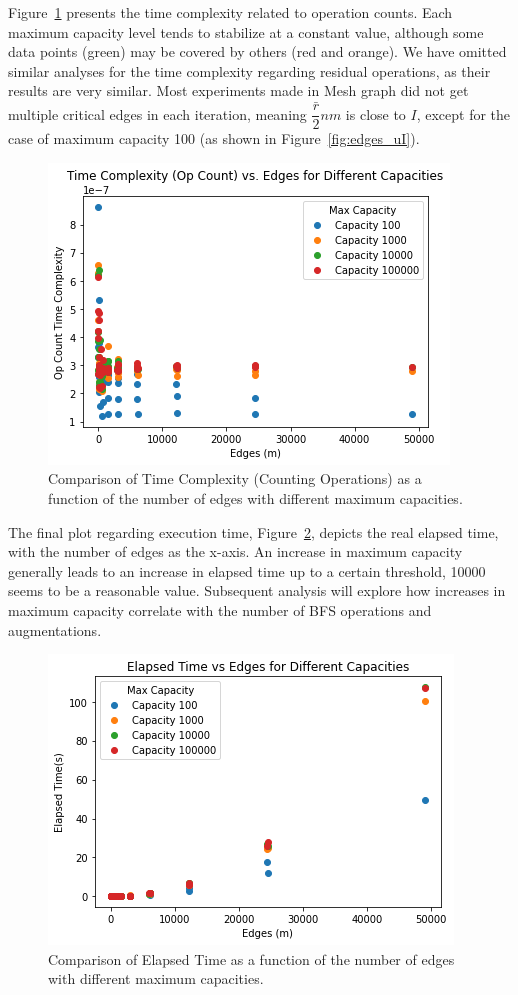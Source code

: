 \documentclass{article}
\begin{document}
Figure~\ref{fig:opcount_time} presents the time complexity related to operation counts. Each maximum capacity level tends to stabilize at a constant value, although some data points (green) may be covered by others (red and orange). We have omitted similar analyses for the time complexity regarding residual operations, as their results are very similar. Most experiments made in Mesh graph did not get multiple critical edges in each iteration, meaning $\dfrac{\bar{r}}{2}nm$ is close to \(I\), except for the case of maximum capacity 100 (as shown in Figure~\ref{fig:edges_uI}).

\begin{figure}[H]
\centering
\includegraphics[width=0.6\linewidth]{opcount_time.png}
\caption{Comparison of Time Complexity (Counting Operations) as a function of the number of edges with different maximum capacities.}
\label{fig:opcount_time}
\end{figure}

The final plot regarding execution time, Figure~\ref{fig:elapsed_time}, depicts the real elapsed time, with the number of edges as the x-axis. An increase in maximum capacity generally leads to an increase in elapsed time up to a certain threshold, 10000 seems to be a reasonable value. Subsequent analysis will explore how increases in maximum capacity correlate with the number of BFS operations and augmentations.

\begin{figure}[H]
\centering
\includegraphics[width=0.6\linewidth]{elapsed_time.png}
\caption{Comparison of Elapsed Time as a function of the number of edges with different maximum capacities.}
\label{fig:elapsed_time}
\end{figure}
\end{document}
